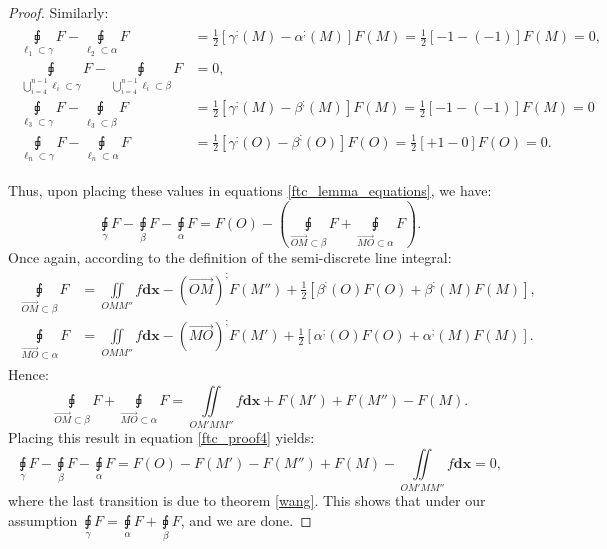 \documentclass[11pt]{book}
\begin{document}
\begin{proof}
Similarly:
\begin{align}
\begin{aligned}
\underset{\ell_{1}\subset\gamma}{\sqint}F-\underset{\ell_{2}\subset\alpha}{\sqint}F & =\frac{1}{2}\left[\gamma^{;}\left(M\right)-\alpha^{;}\left(M\right)\right]F\left(M\right)=\frac{1}{2}\left[-1-\left(-1\right)\right]F\left(M\right)=0,\\
\underset{\bigcup_{i=4}^{n-1}\ell_{i}\subset\gamma}{\sqint}F-\underset{\bigcup_{i=4}^{n-1}\ell_{i}\subset\beta}{\sqint}F & =0,\\
\underset{\ell_{3}\subset\gamma}{\sqint}F-\underset{\ell_{3}\subset\beta}{\sqint}F & =\frac{1}{2}\left[\gamma^{;}\left(M\right)-\beta^{;}\left(M\right)\right]F\left(M\right)=\frac{1}{2}\left[-1-\left(-1\right)\right]F\left(M\right)=0\\
\underset{\ell_{n}\subset\gamma}{\sqint}F-\underset{\ell_{n}\subset\alpha}{\sqint}F & =\frac{1}{2}\left[\gamma^{;}\left(O\right)-\beta^{;}\left(O\right)\right]F\left(O\right)=\frac{1}{2}\left[+1-0\right]F\left(O\right)=0.
\end{aligned}
\end{align}

Thus, upon placing these values in equations \ref{ftc_lemma_equations}, we have:
\[
\underset{\gamma}{\sqint}F-\underset{\beta}{\sqint}F-\underset{\alpha}{\sqint}F=F\left(O\right)-\left(\underset{\overrightarrow{OM}\subset\beta}{\sqint}F+\underset{\overrightarrow{MO}\subset\alpha}{\sqint}F\right).\label{ftc_proof4}
\]
Once again, according to the definition of the semi-discrete line integral:
\begin{align}
\begin{aligned}
\underset{\overrightarrow{OM}\subset\beta}{\sqint}F & =\underset{OMM''}{\iint}f\boldsymbol{dx}-\left(\overrightarrow{OM}\right)^{;}F\left(M''\right)+\frac{1}{2}\left[\beta^{;}\left(O\right)F\left(O\right)+\beta^{;}\left(M\right)F\left(M\right)\right],\\
\underset{\overrightarrow{MO}\subset\alpha}{\sqint}F & =\underset{OMM''}{\iint}f\boldsymbol{dx}-\left(\overrightarrow{MO}\right)^{;}F\left(M'\right)+\frac{1}{2}\left[\alpha^{;}\left(O\right)F\left(O\right)+\alpha^{;}\left(M\right)F\left(M\right)\right].
\end{aligned}
\end{align}
Hence:
\[
\underset{\overrightarrow{OM}\subset\beta}{\sqint}F+\underset{\overrightarrow{MO}\subset\alpha}{\sqint}F=\underset{OM'MM''}{\iint}f\boldsymbol{dx}+F\left(M'\right)+F\left(M''\right)-F\left(M\right).
\]
Placing this result in equation \ref{ftc_proof4} yields:
\[
\underset{\gamma}{\sqint}F-\underset{\beta}{\sqint}F-\underset{\alpha}{\sqint}F=F\left(O\right)-F\left(M'\right)-F\left(M''\right)+F\left(M\right)-\underset{OM'MM''}{\iint}f\boldsymbol{dx}=0,
\]
where the last transition is due to theorem \ref{wang}.
This shows that under our assumption $\underset{\gamma}{\sqint}F=\underset{\alpha}{\sqint}F+\underset{\beta}{\sqint}F$,
and we are done.


\end{proof}
\end{document}
